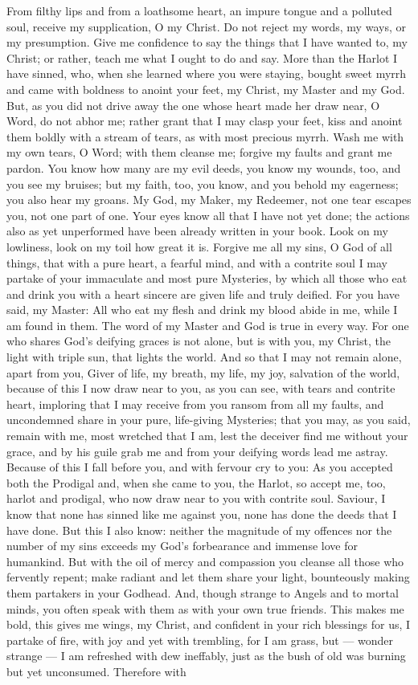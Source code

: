 From filthy lips and from a loathsome heart, an impure tongue and a polluted soul, receive my supplication, O my Christ. Do not reject my words, my ways, or my presumption. Give me confidence to say the things that I have wanted to, my Christ; or rather, teach me what I ought to do and say. More than the Harlot I have sinned, who, when she learned where you were staying, bought sweet myrrh and came with boldness to anoint your feet, my Christ, my Master and my God. But, as you did not drive away the one whose heart made her draw near, O Word, do not abhor me; rather grant that I may clasp your feet, kiss and anoint them boldly with a stream of tears, as with most precious myrrh. Wash me with my own tears, O Word; with them cleanse me; forgive my faults and grant me pardon. You know how many are my evil deeds, you know my wounds, too, and you see my bruises; but my faith, too, you know, and you behold my eagerness; you also hear my groans. My God, my Maker, my Redeemer, not one tear escapes you, not one part of one. Your eyes know all that I have not yet done; the actions also as yet unperformed have been already written in your book. Look on my lowliness, look on my toil how great it is. Forgive me all my sins, O God of all things, that with a pure heart, a fearful mind, and with a contrite soul I may partake of your immaculate and most pure Mysteries, by which all those who eat and drink you with a heart sincere are given life and truly deified. For you have said, my Master: All who eat my flesh and drink my blood abide in me, while I am found in them. The word of my Master and God is true in every way. For one who shares God's deifying graces is not alone, but is with you, my Christ, the light with triple sun, that lights the world. And so that I may not remain alone, apart from you, Giver of life, my breath, my life, my joy, salvation of the world, because of this I now draw near to you, as you can see, with tears and contrite heart, imploring that I may receive from you ransom from all my faults, and uncondemned share in your pure, life-giving Mysteries; that you may, as you said, remain with me, most wretched that I am, lest the deceiver find me without your grace, and by his guile grab me and from your deifying words lead me astray. Because of this I fall before you, and with fervour cry to you: As you accepted both the Prodigal and, when she came to you, the Harlot, so accept me, too, harlot and prodigal, who now draw near to you with contrite soul. Saviour, I know that none has sinned like me against you, none has done the deeds that I have done. But this I also know: neither the magnitude of my offences nor the number of my sins exceeds my God's forbearance and immense love for humankind. But with the oil of mercy and compassion you cleanse all those who fervently repent; make radiant and let them share your light, bounteously making them partakers in your Godhead. And, though strange to Angels and to mortal minds, you often speak with them as with your own true friends. This makes me bold, this gives me wings, my Christ, and confident in your rich blessings for us, I partake of fire, with joy and yet with trembling, for I am grass, but --- wonder strange --- I am refreshed with dew ineffably, just as the bush of old was burning but yet unconsumed. Therefore with 